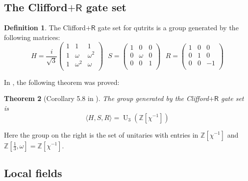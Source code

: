 \documentclass{eptcs}
\newtheorem{theorem}{Theorem}[section]
\theoremstyle{remark}
\theoremstyle{definition}
\newtheorem{definition}[theorem]{Definition}
\DeclareMathOperator{\U}{U}
\begin{document}
\subsection{\texorpdfstring{The Clifford$+\mathsf{R}$ gate set}{The Clifford+R gate set}}
\begin{definition}
\label{de:hsr}
The Clifford$+\mathsf{R}$ gate set for qutrits is a group generated by the following matrices:
\[
H=\frac{i}{\sqrt{3}}\begin{pmatrix}
1 & 1 & 1\\
1 & \omega & \omega^{2}\\
1 & \omega^{2} & \omega\\
\end{pmatrix}~~~
S=\begin{pmatrix}
1 & 0 & 0\\
0 & \omega & 0\\
0 & 0 & 1\\
\end{pmatrix}~~~
R=
\begin{pmatrix}
1 & 0 & 0\\
0 & 1 & 0\\
0 & 0 & -1\\
\end{pmatrix}
\]
\end{definition}
In \cite{Kalra2025synthesisarithmetic}, the following theorem was proved:  
\begin{theorem}[Corollary 5.8 in \cite{Kalra2025synthesisarithmetic}] 
\label{th:ring_equality_p_is_3}
The group generated by the Clifford$+\mathsf{R}$ gate set is
\[
\langle H,S,R \rangle  =\U_{3}\left(\mathbb{Z}[\chi^{-1}]\right)
\]
\end{theorem}
Here the group on the right is the set of unitaries with entries in $\mathbb{Z}[\chi^{-1}]$ and $\mathbb{Z}[\tfrac{1}{3}, \omega]= \mathbb{Z}[\chi^{-1}]$.
\subsection{Local fields}
\end{document}
